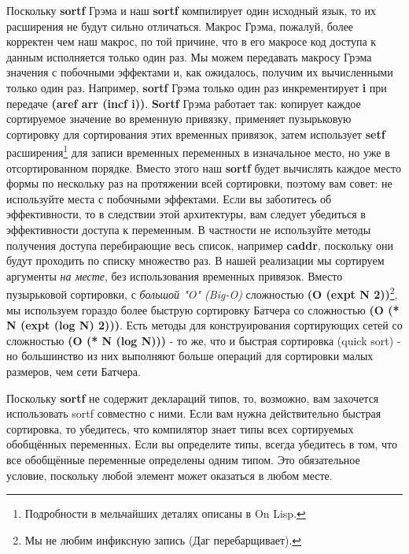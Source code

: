 Поскольку \textbf{sortf} Грэма и наш \textbf{sortf} компилирует один исходный язык, то их расширения не будут сильно отличаться. Макрос Грэма, пожалуй, более корректен чем наш макрос, по той причине, что в его макросе код доступа к данным исполняется только один раз. Мы можем передавать макросу Грэма значения с побочными эффектами и, как ожидалось, получим их вычисленными только один раз. Например, \textbf{sortf} Грэма только один раз инкрементирует \textbf{i} при передаче \textbf{(aref arr (incf i))}. \textbf{Sortf} Грэма работает так: копирует каждое сортируемое значение во временную привязку, применяет пузырьковую сортировку для сортирования этих временных привязок, затем использует \textbf{setf} расширения\footnote{Подробности в мельчайших деталях описаны в On Lisp.} для записи временных переменных в изначальное место, но уже в отсортированном порядке. Вместо этого наш \textbf{sortf} будет вычислять каждое место формы по нескольку раз на протяжении всей сортировки, поэтому вам совет: не используйте места с побочными эффектами. Если вы заботитесь об эффективности, то в следствии этой архитектуры, вам следует убедиться в эффективности доступа к переменным. В частности не используйте методы получения доступа перебирающие весь список, например \textbf{caddr}, поскольку они будут проходить по списку множество раз. В нашей реализации мы сортируем аргументы \emph{на месте}, без использования временных привязок. Вместо пузырьковой сортировки, с \emph{большой "O" (Big-O)} сложностью \textbf{(O (expt N 2))}\footnote{Мы не любим инфиксную запись (Даг перебарщивает).}, мы используем гораздо более быструю сортировку Батчера со сложностью  \textbf{(O (* N (expt (log N) 2)))}. Есть методы для конструирования сортирующих сетей со сложностью \textbf{(O (* N (log N)))} - то же, что и быстрая сортировка (quick sort) - но большинство из них выполняют больше операций для сортировки малых размеров, чем сети Батчера.

Поскольку \textbf{sortf} не содержит деклараций типов, то, возможно, вам захочется использовать sortf совместно с ними. Если вам нужна действительно быстрая сортировка, то убедитесь, что компилятор знает типы всех сортируемых обобщённых переменных. Если вы определите типы, всегда убедитесь в том, что все обобщённые переменные определены одним типом. Это обязательное условие, поскольку любой элемент может оказаться в любом месте.


